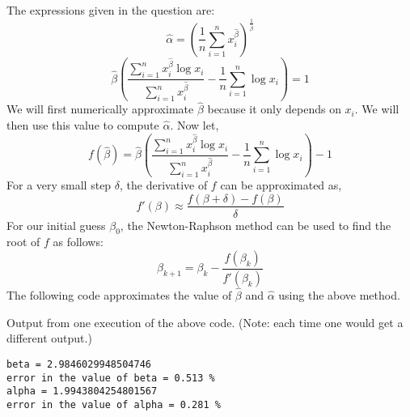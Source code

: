 \documentclass[addpoints]{exam}
\theoremstyle{mytheoremstyle}
\theoremstyle{mytheoremstyle}
\theoremstyle{myproblemstyle}
\begin{document}
\begin{questions}
\begin{parts}
        \begin{solution}
            The expressions given in the question are:
            \[\hat{\alpha} = \left(\frac{1}{n}\sum_{i=1}^{n}x_{i}^{\hat{\beta}}\right)^{\frac{1}{\hat{\beta}}}\]
            \[\hat\beta\left(\frac{\sum_{i=1}^{n}x_{i}^{\hat\beta}\log{x_{i}}}{\sum_{i=1}^{n}x_{i}^{\hat\beta}}-\frac{1}{n}\sum_{i=1}^{n}\log{x_{i}}\right)=1\]
            We will first numerically approximate \(\hat\beta\) because it only depends on \(x_{i}\). We will then use this value to compute \(\hat{\alpha}\). Now let,
            \[f(\hat\beta) = \hat\beta\left(\frac{\sum_{i=1}^{n}x_{i}^{\hat\beta}\log{x_{i}}}{\sum_{i=1}^{n}x_{i}^{\hat\beta}}-\frac{1}{n}\sum_{i=1}^{n}\log{x_{i}}\right)-1\]
            For a very small step \(\delta\), the derivative of \(f\) can be approximated as,
            \[f'(\beta)\approx\frac{f(\beta+\delta)-f(\beta)}{\delta}\]
            For our initial guess \(\beta_{0}\), the Newton-Raphson method can be used to find the root of \(f\) as follows:
            \[\beta_{k+1}=\beta_{k}-\frac{f(\beta_{k})}{f'(\beta_{k})}\]
            The following code approximates the value of \(\hat\beta\) and \(\hat\alpha\) using the above method.
            
            Output from one execution of the above code. (Note: each time one would get a different output.)
            \begin{verbatim}
beta = 2.9846029948504746
error in the value of beta = 0.513 %
alpha = 1.9943804254801567
error in the value of alpha = 0.281 %
            \end{verbatim}
        \end{solution}
    \end{parts}
\end{questions}
\end{document}
